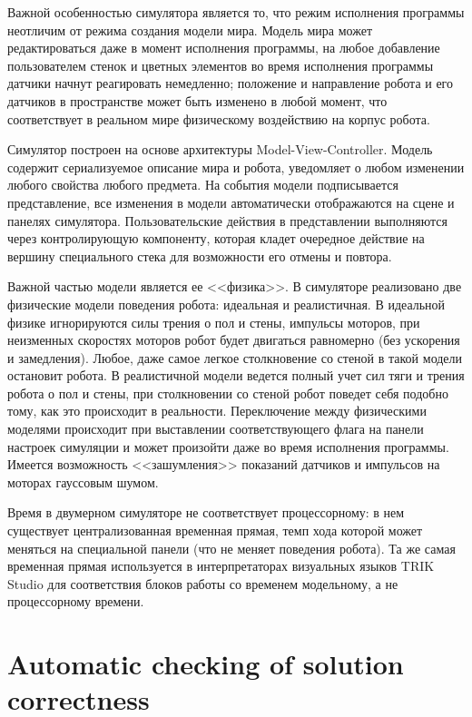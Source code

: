 \documentclass[conference]{IEEEtran}
\begin{document}
{Важной особенностью симулятора является то, что режим исполнения программы неотличим от режима создания модели мира. Модель мира может редактироваться даже в момент исполнения программы, на любое добавление пользователем стенок и цветных элементов во время исполнения программы датчики начнут реагировать немедленно; положение и направление робота и его датчиков в пространстве может быть изменено в любой момент, что соответствует в реальном мире физическому воздействию на корпус робота.

Симулятор построен на основе архитектуры Model-View-Controller. Модель содержит сериализуемое описание мира и робота, уведомляет о любом изменении любого свойства любого предмета. На события модели подписывается представление, все изменения в модели автоматически отображаются на сцене и панелях симулятора. Пользовательские действия в представлении выполняются через контролирующую компоненту, которая кладет очередное действие на вершину специального стека для возможности его отмены и повтора.

Важной частью модели является ее <<физика>>. В симуляторе реализовано две физические модели поведения робота: идеальная и реалистичная. В идеальной физике игнорируются силы трения о пол и стены, импульсы моторов, при неизменных скоростях моторов робот будет двигаться равномерно (без ускорения и замедления). Любое, даже самое легкое столкновение со стеной в такой модели остановит робота. В реалистичной модели ведется полный учет сил тяги и трения робота о пол и стены, при столкновении со стеной робот поведет себя подобно тому, как это происходит в реальности. Переключение между физическими моделями происходит при выставлении соответствующего флага на панели настроек симуляции и может произойти даже во время исполнения программы. Имеется возможность <<зашумления>> показаний датчиков и импульсов на моторах гауссовым шумом.

Время в двумерном симуляторе не соответствует процессорному: в нем существует централизованная временная прямая, темп хода которой может меняться на специальной панели (что не меняет поведения робота). Та же самая временная прямая используется в интерпретаторах визуальных языков TRIK Studio для соответствия блоков работы со временем модельному, а не процессорному времени.

\section{Automatic checking of solution correctness}
\label{chapter:constraintsChecker}

}
\end{document}
